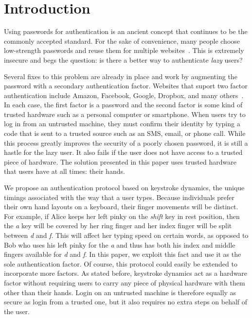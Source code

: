 \documentclass[11pt]{article}
\begin{document}
\section{Introduction}
Using passwords for authentication is an ancient concept that continues to be the commonly accepted standard. For the sake of convenience, many people choose low-strength passwords and reuse them for multiple websites~\cite{Florencio:2007:LSW:1242572.1242661}. This is extremely insecure and begs the question: is there a better way to authenticate \textit{lazy} users?

Several fixes to this problem are already in place and work by augmenting the password with a secondary authentication factor. Websites that suport two factor authentication include Amazon, Facebook, Google, Dropbox, and many others~\cite{2fac}. In each case, the first factor is a password and the second factor is some kind of trusted hardware such as a personal computer or smartphone. When users try to log in from an untrusted machine, they must confirm their identity by typing a code that is sent to a trusted source such as an SMS, email, or phone call. While this process greatly improves the security of a poorly chosen password, it is still a hastle for the lazy user. It also fails if the user does not have access to a trusted piece of hardware. The solution presented in this paper uses trusted hardware that users have at all times: their hands.

We propose an authentication protocol based on keystroke dynamics, the unique timings associated with the way that a user types. Because individuals prefer their own hand layouts on a keyboard, their finger movements will be distinct. For example, if Alice keeps her left pinky on the \textit{shift} key in rest position, then the \textit{a} key will be covered by her ring finger and her index finger will be split between \textit{d} and \textit{f}.  This will affect her typing speed on certain words, as opposed to Bob who uses his left pinky for the \textit{a} and thus has both his index and middle fingers available for \textit{d} and \textit{f}. In this paper, we exploit this fact and use it as the sole authentication factor. Of course, this protocol could easily be extended to incorporate more factors. As stated before, keystroke dynamics act as a hardware factor without requiring users to carry any piece of physical hardware with them other than their hands. Login on an untrusted machine is therefore equally as secure as login from a trusted one, but it also requires no extra steps on behalf of the user.
\end{document}
